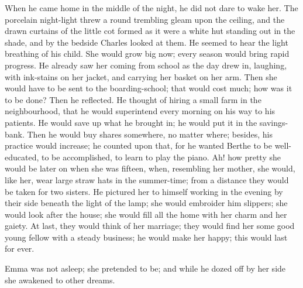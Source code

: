 \documentclass[11pt,twocolumn]{ltugboat}
\begin{document}
When he came home in the middle of the night, he did not dare to wake
her. The porcelain night-light threw a round trembling gleam upon the
ceiling, and the drawn curtains of the little cot formed as it were a
white hut standing out in the shade, and by the bedside Charles looked
at them. He seemed to hear the light breathing of his child. She would
grow big now; every season would bring rapid progress. He already saw
her coming from school as the day drew in, laughing, with ink-stains on
her jacket, and carrying her basket on her arm. Then she would have to
be sent to the boarding-school; that would cost much; how was it to
be done? Then he reflected. He thought of hiring a small farm in the
neighbourhood, that he would superintend every morning on his way to his
patients. He would save up what he brought in; he would put it in the
savings-bank. Then he would buy shares somewhere, no matter where;
besides, his practice would increase; he counted upon that, for he
wanted Berthe to be well-educated, to be accomplished, to learn to play
the piano. Ah! how pretty she would be later on when she was fifteen,
when, resembling her mother, she would, like her, wear large straw hats
in the summer-time; from a distance they would be taken for two sisters.
He pictured her to himself working in the evening by their side beneath
the light of the lamp; she would embroider him slippers; she would look
after the house; she would fill all the home with her charm and her
gaiety. At last, they would think of her marriage; they would find her
some good young fellow with a steady business; he would make her happy;
this would last for ever.

Emma was not asleep; she pretended to be; and while he dozed off by her
side she awakened to other dreams.
\end{document}
